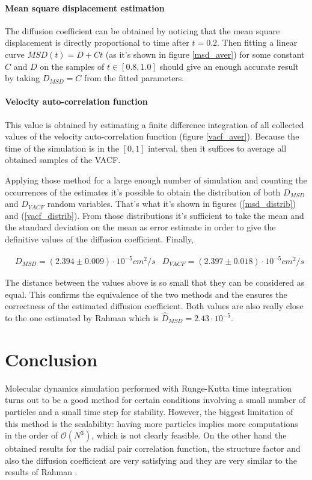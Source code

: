 \documentclass[12pt,english]{smfart}
\begin{document}
\paragraph{Mean square displacement estimation}
The diffusion coefficient can be obtained by noticing that the mean square displacement is directly proportional to time after $t=0.2$. Then fitting a linear curve $MSD(t) = D + Ct$ (as it's shown in figure \ref{msd_aver}) for some constant $C$ and $D$ on the samples of $t \in [0.8, 1.0]$ should give an enough accurate result by taking $D_{MSD} = C$ from the fitted parameters.

\paragraph{Velocity auto-correlation function}
This value is obtained by estimating a finite difference integration of all collected values of the velocity auto-correlation function (figure \ref{vacf_aver}). Because the time of the simulation is in the $[0, 1]$ interval, then it suffices to average all obtained samples of the VACF.

Applying those method for a large enough number of simulation and counting the occurrences of the estimates it's possible to obtain the distribution of both $D_{MSD}$ and $D_{VACF}$ random variables. That's what it's shown in figures (\ref{msd_distrib}) and (\ref{vacf_distrib}).
From those distributions it's sufficient to take the mean and the standard deviation on the mean as error estimate in order to give the definitive values of the diffusion coefficient. Finally, 

\begin{align}
    &D_{MSD} = (2.394 \pm 0.009) \cdot 10^{-5} \si{cm^2/s} 
    &D_{VACF} = (2.397 \pm 0.018) \cdot 10^{-5} \si{cm^2/s}
\end{align}

The distance between the values above is so small that they can be considered as equal. This confirms the equivalence of the two methods and the ensures the correctness of the estimated diffusion coefficient. Both values are also really close to the one estimated by Rahman \cite{Rahman} which is $\hat{D}_{MSD} = 2.43 \cdot 10^{-5}$.

\section{Conclusion}
\label{conc}
Molecular dynamics simulation performed with Runge-Kutta time integration turns out to be a good method for certain conditions involving a small number of particles and a small time step for stability. However, the biggest limitation of this method is the scalability: having more particles implies more computations in the order of $\mathcal{O}(N^3)$, which is not clearly feasible. On the other hand the obtained results for the radial pair correlation function, the structure factor and also the diffusion coefficient are very satisfying and they are very similar to the results of Rahman \cite{Rahman}. 
\end{document}
